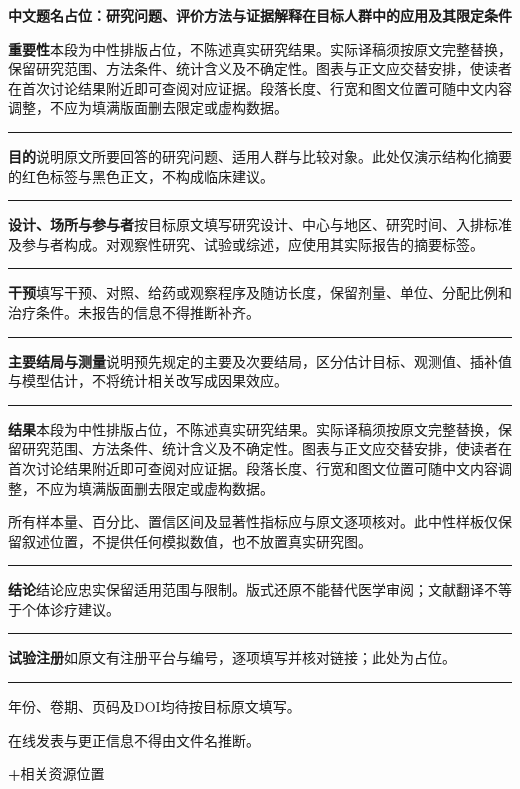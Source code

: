 \documentclass[UTF8,fontset=none]{ctexart}
\newcommand{\absrow}[2]{\noindent\textcolor{JAMARed}{\sffamily\bfseries #1}\enspace #2\par\smallskip\textcolor{white}{\rule{\linewidth}{.35bp}}\par\smallskip}
\newcommand{\neutralpara}{本段为中性排版占位，不陈述真实研究结果。实际译稿须按原文完整替换，保留研究范围、方法条件、统计含义及不确定性。图表与正文应交替安排，使读者在首次讨论结果附近即可查阅对应证据。段落长度、行宽和图文位置可随中文内容调整，不应为填满版面删去限定或虚构数据。}
\begin{document}
\thispagestyle{first}\fontsize{8.8bp}{11.6bp}\selectfont
{}\par\vspace{5bp}
{\sffamily\bfseries\fontsize{14.5bp}{17.2bp}\selectfont\noindent 中文题名占位：研究问题、评价方法与证据解释在目标人群中的应用及其限定条件\par}
\vspace{12bp}\noindent\begin{minipage}[t]{347.2bp}\vspace{0pt}\setlength{\fboxsep}{11bp}\colorbox{JAMABeige}{\begin{minipage}{325.2bp}\sffamily\fontsize{8.8bp}{11.7bp}\selectfont\setlength{\parindent}{0pt}
\absrow{重要性}{\neutralpara}
\absrow{目的}{说明原文所要回答的研究问题、适用人群与比较对象。此处仅演示结构化摘要的红色标签与黑色正文，不构成临床建议。}
\absrow{设计、场所与参与者}{按目标原文填写研究设计、中心与地区、研究时间、入排标准及参与者构成。对观察性研究、试验或综述，应使用其实际报告的摘要标签。}
\absrow{干预}{填写干预、对照、给药或观察程序及随访长度，保留剂量、单位、分配比例和治疗条件。未报告的信息不得推断补齐。}
\absrow{主要结局与测量}{说明预先规定的主要及次要结局，区分估计目标、观测值、插补值与模型估计，不将统计相关改写成因果效应。}
\absrow{结果}{\neutralpara\par 所有样本量、百分比、置信区间及显著性指标应与原文逐项核对。此中性样板仅保留叙述位置，不提供任何模拟数值，也不放置真实研究图。}
\absrow{结论}{结论应忠实保留适用范围与限制。版式还原不能替代医学审阅；文献翻译不等于个体诊疗建议。}
\absrow{试验注册}{如原文有注册平台与编号，逐项填写并核对链接；此处为占位。}
{\fontsize{6.6bp}{8.3bp}\selectfont 年份、卷期、页码及DOI均待按目标原文填写。\par 在线发表与更正信息不得由文件名推断。\par}
\end{minipage}}\end{minipage}\hfill\begin{minipage}[t]{108bp}\vspace{0pt}\sffamily\fontsize{7.1bp}{9.5bp}\selectfont
\textcolor{JAMARed}{\textbf{+}}\enspace 相关资源位置\par\medskip

\end{minipage}
\end{document}
